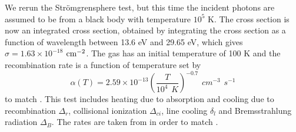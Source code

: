 \documentclass[fleq,usenatbib]{mnras}
\newcommand{\strom}{Str\"omgren}
\begin{document}
We rerun the \strom sphere test, but this time the incident photons are 
assumed to be from a black body with temperature $10^5$ K. The cross section 
is now an integrated cross section, obtained by integrating the cross section 
as a function of wavelength between 13.6 eV and 29.65 eV, which gives $\sigma 
= 1.63 \times 10^{-18}$ $\rm cm^{-2}$. The gas has an initial temperature of 
100 K and the recombination rate is a function of temperature set by
\begin{equation}
\alpha(T) = 2.59 \times 10^{-13} \left( \frac{T}{10^4 \hspace{5pt} K}\right)^
{-0.7} \hspace{5pt} cm^{-3} \hspace{5pt} s^{-1}
\end{equation}
to match \cite{petkovaSpringel09}. This test includes heating due to 
absorption and cooling due to recombination $\Delta_r$, collisional 
ionization $\Delta_{ci}$, line cooling $\delta_l$ and Bremsstrahlung 
radiation $\Delta_B$. The rates are taken from \cite{cen92} in order to
match \cite{petkovaSpringel09}.
\end{document}
